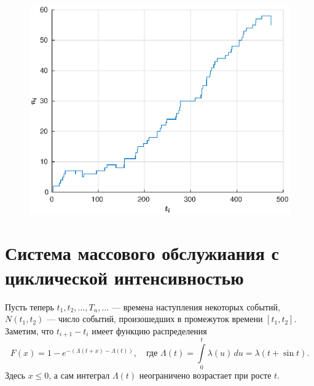 \begin{figure}[h]
\noindent
        \centering
        {
        \includegraphics[width=120mm]{task_11/1-l-0-2.eps}}
        \caption{}
\end{figure}


\section{Система массового обслужиания с циклической интенсивностью}

Пусть теперь $t_1,t_2,\ldots,T_n,\ldots$ --- времена наступления некоторых событий, $N(t_1,t_2)$ --- число событий, произошедших в промежуток времени $[t_1,t_2]$. Заметим, что $t_{i+1} - t_i$ имеет функцию распределения
$$
        F(x) = 1 - e^{-(\Lambda(t+x) - \Lambda(t))},
        \quad
        \mbox{где }
        \Lambda(t) = \int\limits_0^t\lambda(u)\,du = \lambda(t + \sin t).
$$
Здесь $x \leqslant 0$, а сам интеграл $\Lambda(t)$ неограничено возрастает при росте $t$.
